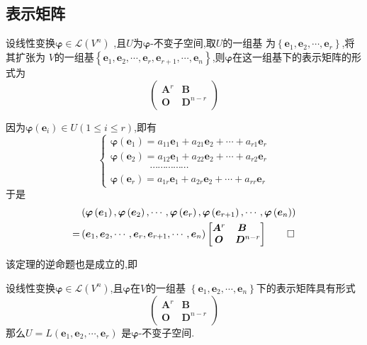 \subsection{表示矩阵}
\begin{formal}
\begin{theorem}[不变子空间诱导的线性变换的表示矩阵]\label{thm:不变子空间诱导的线性变换的表示矩阵}
    设线性变换$\bm{\varphi}\in \mathcal{L}\left(V^n\right)$
    ,且$U$为$\bm{\varphi}$-不变子空间,取$U$的一组基
    为$\left\{\bm{e}_1,\bm{e}_2,
    \cdots,\bm{e}_r\right\}$,将其扩张为
    $V$的一组基$\left\{\bm{e}_1,\bm{e}_2,\cdots,\bm{e}_r,\bm{e}_{r+1},\cdots,
    \bm{e}_n\right\}$,则$\bm{\varphi}$在这一组基下的表示矩阵的形式为
    \[
    \begin{pmatrix}
        \bm{A}^r&\bm{B}\quad\,\\
        \bm{O}&\bm{D}^{n-r}
    \end{pmatrix}
    \]
\end{theorem}
\begin{Proof}
因为$\bm{\varphi}\left(\bm{e}_i\right)\in U\left(1\leqslant i\leqslant r\right)$,即有
\newpage
\[
\begin{cases*}
\bm{\varphi}\left(\bm{e}_1\right)=a_{11}\bm{e}_1+a_{21}\bm{e}_2+\cdots+a_{r1}\bm{e}_r\\
\bm{\varphi}\left(\bm{e}_2\right)=a_{12}\bm{e}_1+a_{22}\bm{e}_2+\cdots+a_{r2}\bm{e}_r\\
\qquad\qquad\cdots\cdots\cdots\cdots\cdots\\
\bm{\varphi}\left(\bm{e}_r\right)=a_{1r}\bm{e}_1+a_{2r}\bm{e}_2+\cdots+a_{rr}\bm{e}_r
\end{cases*}
\]
于是
\begin{align*}
   & \left(\bm{\varphi}\left(\bm{e}_1\right),
\bm{\varphi}\left(\bm{e}_2\right),
\cdots,\bm{\varphi}\left(\bm{e}_r\right),
\bm{\varphi}\left(\bm{e}_{r+1}\right),
\cdots,\bm{\varphi}\left(\bm{e}_n\right)\right)
\\
=&
\left(\bm{e}_1,\bm{e}_2,\cdots,\bm{e}_r,\bm{e}_{r+1},\cdots,\bm{e}_n\right)
\begin{bmatrix}
    \bm{A}^r&\bm{B}\quad\,\\
    \bm{O}&\bm{D}^{n-r}
\end{bmatrix}
\qedhere
\end{align*}
\end{Proof}
\end{formal}
该定理的逆命题也是成立的,即
\begin{formal}
\begin{theorem}[逆命题]\label{thm:逆命题}
    设线性变换$\bm{\varphi}\in \mathcal{L}\left(
        V^n\right)$,且$\bm{\varphi}$在$V$的一组基
        $\left\{\bm{e}_1,\bm{e}_2,\cdots,
        \bm{e}_n\right\}$下的表示矩阵具有形式
        \[
    \begin{pmatrix}
        \bm{A}^r&\bm{B}\quad\,\\
        \bm{O}&\bm{D}^{n-r}
    \end{pmatrix}
    \]
    那么$U=L\left(\bm{e}_1,\bm{e}_2,\cdots,\bm{e}_r\right)$
是$\bm{\varphi}$-不变子空间.
\end{theorem}
\end{formal}

